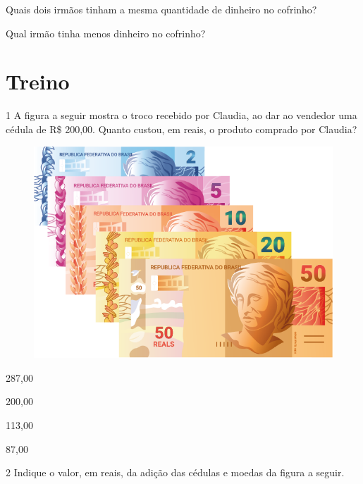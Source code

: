 \begin{escolha}[itemsep=-5pt]
\item Quais dois irmãos tinham a mesma quantidade de dinheiro no cofrinho?

\item Qual irmão tinha menos dinheiro no cofrinho?
\end{escolha}

\section*{Treino}

\num{1} A figura a seguir mostra o troco recebido por Claudia, ao dar ao vendedor
uma cédula de R\$ 200,00. Quanto custou, em reais, o produto comprado por Claudia?


\begin{figure}[htpb!]
\centering
\includegraphics[width=.5\textwidth]{./media/image78.png}
\end{figure}

\begin{escolha}[itemsep=-5pt]
\item 287,00

\item 200,00

\item 113,00

\item 87,00
\end{escolha}

\pagebreak
\num{2} Indique o valor, em reais, da adição das cédulas e moedas da figura a seguir.


